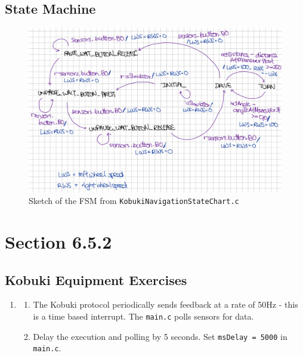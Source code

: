 \documentclass[11pt]{article}
\begin{document}
\subsection{State Machine}
\begin{figure}[H]
    \centering
    \includegraphics[scale=0.26]{FSM.jpeg}
    \caption{Sketch of the FSM from \texttt{KobukiNavigationStateChart.c}}
    \label{fig:FSM}
\end{figure}

\section{Section 6.5.2}
\subsection*{Kobuki Equipment Exercises}
\begin{enumerate}
    \item %
    \begin{enumerate}
        \item %
        The Kobuki protocol periodically sends feedback at a rate of 50Hz - this is a time based interrupt. The \texttt{main.c} polls sensors for data.
        \item %
        Delay the execution and polling by 5 seconds. Set \texttt{msDelay = 5000} in \texttt{main.c}.
    \end{enumerate}
\end{enumerate}
\end{document}
